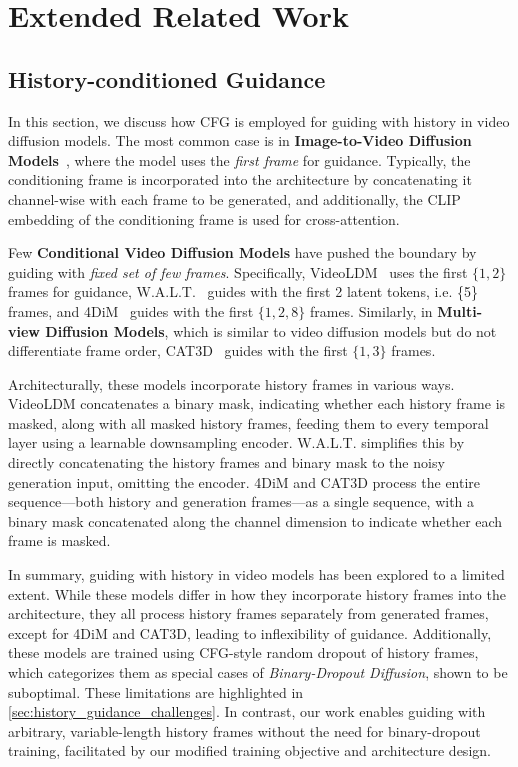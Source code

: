\section{Extended Related Work}
\label{app:related_work}


\subsection{History-conditioned Guidance}

In this section, we discuss how CFG is employed for guiding with history in video diffusion models. The most common case is in \textbf{Image-to-Video Diffusion Models}~\cite{blattmann2023stable,xing2023dynamicrafter,yang2024cogvideox}, where the model uses the \emph{first frame} for guidance. Typically, the conditioning frame is incorporated into the architecture by concatenating it channel-wise with each frame to be generated, and additionally, the CLIP~\cite{radford2021learning} embedding of the conditioning frame is used for cross-attention.

Few \textbf{Conditional Video Diffusion Models} have pushed the boundary by guiding with \emph{fixed set of few frames}. Specifically, VideoLDM~\cite{blattmann2023align} uses the first $\{1, 2\}$ frames for guidance, W.A.L.T.~\cite{gupta2023photorealistic} guides with the first 2 latent tokens, i.e. \{5\} frames, and 4DiM~\cite{watson2024controlling} guides with the first $\{1, 2, 8\}$ frames. Similarly, in \textbf{Multi-view Diffusion Models}, which is similar to video diffusion models but do not differentiate frame order, CAT3D~\cite{gao2024cat3d} guides with the first $\{1, 3\}$ frames. 

Architecturally, these models incorporate history frames in various ways. VideoLDM concatenates a binary mask, indicating whether each history frame is masked, along with all masked history frames, feeding them to every temporal layer using a learnable downsampling encoder. W.A.L.T. simplifies this by directly concatenating the history frames and binary mask to the noisy generation input, omitting the encoder. 4DiM and CAT3D process the entire sequence—both history and generation frames—as a single sequence, with a binary mask concatenated along the channel dimension to indicate whether each frame is masked.

In summary, guiding with history in video models has been explored to a limited extent. While these models differ in how they incorporate history frames into the architecture, they all process history frames separately from generated frames, except for 4DiM and CAT3D, leading to inflexibility of guidance. Additionally, these models are trained using CFG-style random dropout of history frames, which categorizes them as special cases of \emph{Binary-Dropout Diffusion}, shown to be suboptimal. These limitations are highlighted in \cref{sec:history_guidance_challenges}. In contrast, our work enables guiding with arbitrary, variable-length history frames without the need for binary-dropout training, facilitated by our modified training objective and architecture design.


    


